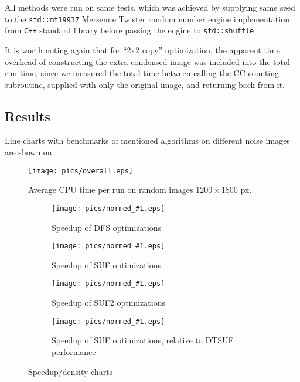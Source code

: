 \documentclass[hidelinks]{llncs}
\newcommand{\CXX}{\texttt{C++} \xspace}
\begin{document}
All methods were run on same tests, which was achieved by supplying same seed to
the \texttt{std::mt19937} Mersenne Twister\cite{mt19937} random number engine
implementation from \CXX standard library before passing the engine to
\texttt{std::shuffle}.

It is worth noting again that for ``2x2 copy'' optimization, the apparent time
overhead of constructing the extra condensed image  was included into the total
run time, since we measured the total time between calling the CC counting
subroutine, supplied with only the original image, and returning back from
it.

\subsection{Results}

Line charts with benchmarks of mentioned algorithms on different noise images
are shown on .

\begin{figure}
  \centering
  \texttt{[image: pics/overall.eps]}
  \caption{Average CPU time per run on random images $1200 \times 1800$ px.}
  \label{fig:overall}
\end{figure}

\newcommand{\inputnorm}[2]{
  \begin{subfigure}[t]{0.45\linewidth}
    \centering
    \texttt{[image: pics/normed\_\#1.eps]}
    \caption{Speedup of #2}
    \label{fig:normed:#1}
  \end{subfigure}
}

\begin{figure}
  \centering
  \inputnorm{DFS}{DFS optimizations}
  \inputnorm{SUF}{SUF optimizations}
  \inputnorm{SUF2}{SUF2 optimizations}
  \inputnorm{DTSUF}{SUF optimizations, relative to DTSUF performance}
  \caption{Speedup/density charts}
  \label{fig:normed}
\end{figure}

\end{document}
